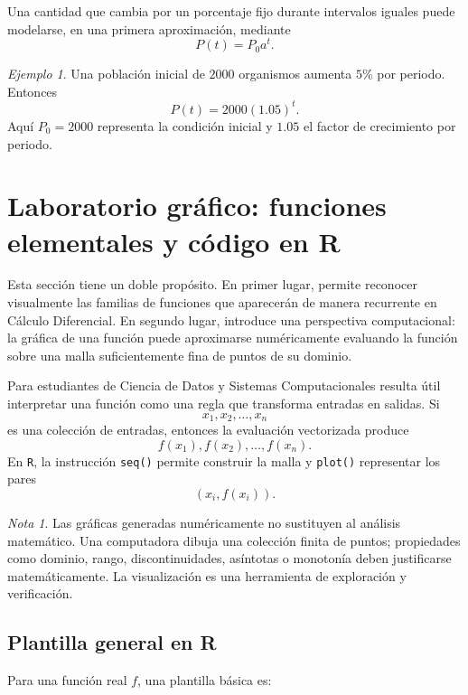 \documentclass[12pt]{article}
\theoremstyle{remark}
\newtheorem{ejemplo}{Ejemplo}[section]
\newtheorem{nota}{Nota}[section]
\begin{document}
Una cantidad que cambia por un porcentaje fijo durante intervalos iguales puede
modelarse, en una primera aproximación, mediante
\[
P(t)=P_0a^t.
\]

\begin{ejemplo}
Una población inicial de $2000$ organismos aumenta $5\%$ por periodo. Entonces
\[
P(t)=2000(1.05)^t.
\]
Aquí $P_0=2000$ representa la condición inicial y $1.05$ el factor de
crecimiento por periodo.
\end{ejemplo}


\section{Laboratorio gráfico: funciones elementales y código en R}

Esta sección tiene un doble propósito. En primer lugar, permite reconocer
visualmente las familias de funciones que aparecerán de manera recurrente en
Cálculo Diferencial. En segundo lugar, introduce una perspectiva computacional:
la gráfica de una función puede aproximarse numéricamente evaluando la función
sobre una malla suficientemente fina de puntos de su dominio.

Para estudiantes de Ciencia de Datos y Sistemas Computacionales resulta útil
interpretar una función como una regla que transforma entradas en salidas. Si
\[
x_1,x_2,\ldots,x_n
\]
es una colección de entradas, entonces la evaluación vectorizada produce
\[
f(x_1),f(x_2),\ldots,f(x_n).
\]
En \texttt{R}, la instrucción \texttt{seq()} permite construir la malla y
\texttt{plot()} representar los pares
\[
(x_i,f(x_i)).
\]

\begin{nota}
Las gráficas generadas numéricamente no sustituyen al análisis matemático.
Una computadora dibuja una colección finita de puntos; propiedades como
dominio, rango, discontinuidades, asíntotas o monotonía deben justificarse
matemáticamente. La visualización es una herramienta de exploración y
verificación.
\end{nota}

\subsection{Plantilla general en R}

Para una función real $f$, una plantilla básica es:
\end{document}

